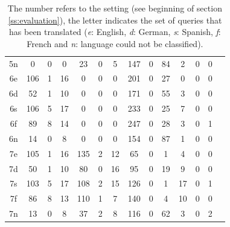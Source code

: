 \documentclass[a4paper,11pt]{article}
\begin{document}
\begin{table}[t]
\begin{tabular}{c|c|c|c|c|c|c|c|c|c|c|c|c|c}
		5n & 0 & 0 & 0 & 23 & 0 & 5 & 147 & 0 & 84 & 2 & 0 & 0\\
		6e & 106 & 1 & 16 & 0 & 0 & 0 & 201 & 0 & 27 & 0 & 0 & 0\\
		6d & 52 & 1 & 10 & 0 & 0 & 0 & 171 & 0 & 55 & 3 & 0 & 0\\
		6s & 106 & 5 & 17 & 0 & 0 & 0 & 233 & 0 & 25 & 7 & 0 & 0\\
		6f & 89 & 8 & 14 & 0 & 0 & 0 & 247 & 0 & 28 & 3 & 0 & 1\\
		6n & 14 & 0 & 8 & 0 & 0 & 0 & 154 & 0 & 87 & 1 & 0 & 0\\
		7e & 105 & 1 & 16 & 135 & 2 & 12 & 65 & 0 & 1 & 4 & 0 & 0\\
		7d & 50 & 1 & 10 & 80 & 0 & 16 & 95 & 0 & 19 & 9 & 0 & 0\\
		7s & 103 & 5 & 17 & 108 & 2 & 15 & 126 & 0 & 1 & 17 & 0 & 1\\
		7f & 86 & 8 & 13 & 110 & 1 & 7 & 140 & 0 & 4 & 10 & 0 & 0\\
		7n & 13 & 0 & 8 & 37 & 2 & 8 & 116 & 0 & 62 & 3 & 0 & 2\\
	\end{tabular}
	\caption{The number refers to the setting (see beginning of section \ref{ss:evaluation}), the letter indicates the set of queries that has been translated (\textit{e}: English, \textit{d}: German, \textit{s}: Spanish, \textit{f}: French and \textit{n}: language could not be classified).}
	\label{tab:stats}
\end{table}
	
\end{document}
